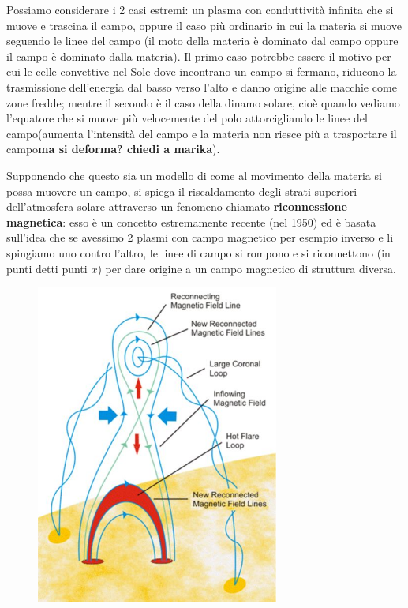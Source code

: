Possiamo considerare i 2 casi estremi: un plasma con conduttività infinita che si muove e trascina il campo, oppure il caso più ordinario in cui la materia si muove seguendo le linee del campo (il moto della materia è dominato dal campo oppure il campo è dominato dalla materia). Il primo caso potrebbe essere il motivo per cui le celle convettive nel Sole dove incontrano un campo si fermano, riducono la trasmissione dell'energia dal basso verso l'alto e danno origine alle macchie come zone fredde; mentre il secondo è il caso della dinamo solare, cioè quando vediamo l'equatore che si muove più velocemente del polo attorcigliando le linee del campo(aumenta l'intensità del campo e la materia non riesce più a trasportare il campo\textbf{ma si deforma? chiedi a marika}).

Supponendo che questo sia un modello di come al movimento della materia si possa muovere un campo, si spiega il riscaldamento degli strati superiori dell'atmosfera solare attraverso un fenomeno chiamato \textbf{riconnessione magnetica}: esso è un concetto estremamente recente (nel 1950) ed è basata sull'idea che se avessimo 2 plasmi con campo magnetico per esempio inverso e li spingiamo uno contro l'altro, le linee di campo si rompono e si riconnettono (in punti detti punti $x$) per dare origine a un campo magnetico di struttura diversa.

\begin{figure}[H]
    \centering
    \includegraphics[width=8cm]{Riconnesione magnetica.JPG}
\end{figure}

